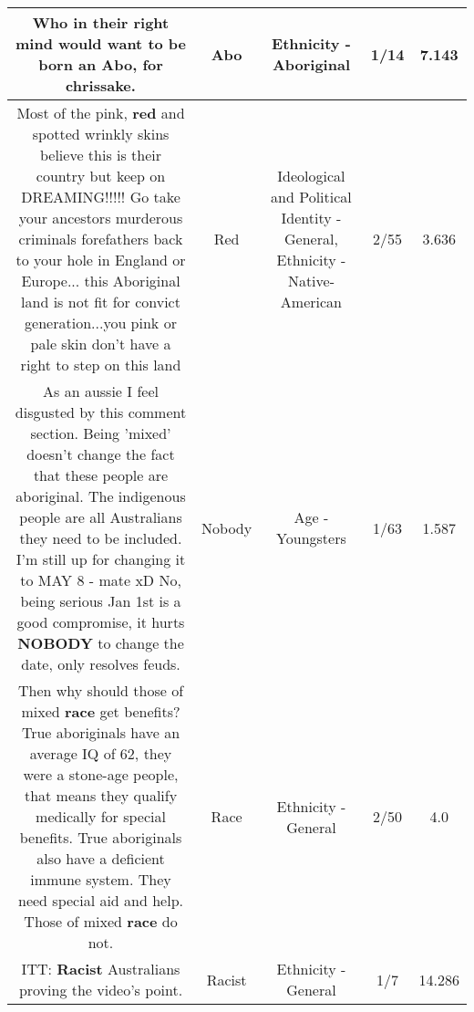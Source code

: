 \documentclass[11pt]{article}
\newlength\mylength
\begin{document}
\begin{center}
\begin{longtable}{|C{.65\mylength}|C{.30\mylength}|C{.12\mylength}|C{.12\mylength}|C{.12\mylength}|}
  \small Who in their right mind would want to be born an \textbf{Abo}, for chrissake.\normalsize   & Abo & Ethnicity - Aboriginal & 1/14 & 7.143 \\  \hline
  \small Most of the pink, \textbf{r\textbf{ed}} and spotted wrinkly skins believe this is their country but keep on DREAMING!!!!! Go take your ancestors murderous criminals forefathers back to your hole in England or Europe... this Aboriginal land is not fit for convict generation...you pink or pale skin don't have a right to step on this land\normalsize   & Red &  Ideological and Political Identity - General, Ethnicity - Native-American & 2/55 & 3.636 \\  \hline
  \small As an aussie I feel disgusted by this comment section. Being 'mixed' doesn't change the fact that these people are aboriginal. The indigenous people are all Australians they need to be included. I'm still up for changing it to MAY 8 - mate xD No, being serious Jan 1st is a good compromise, it hurts \textbf{NOBODY} to change the date, only resolves feuds.\normalsize   & Nobody & Age - Youngsters & 1/63 & 1.587 \\  \hline
  \small Then why should those of mixed \textbf{race} get benefits? True aboriginals have an average IQ of 62, they were a stone-age people, that means they qualify medically for special benefits. True aboriginals also have a deficient immune system. They need special aid and help. Those of mixed \textbf{race} do not.\normalsize   & Race & Ethnicity - General & 2/50 & 4.0 \\  \hline
  \small ITT: \textbf{Racist} Australians proving the video's point.\normalsize   & Racist & Ethnicity - General & 1/7 & 14.286 \\  \hline

\end{longtable}
\end{center}
\end{document}
